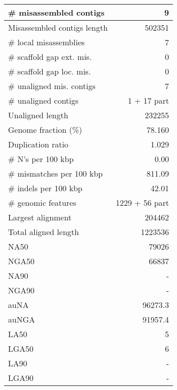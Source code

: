 \documentclass[12pt,a4paper]{article}
\begin{document}
\begin{table}[ht]
\begin{center}
\begin{tabular}{|l*{1}{|r}|}
\# misassembled contigs & 9 \\ \hline
Misassembled contigs length & 502351 \\ \hline
\# local misassemblies & 7 \\ \hline
\# scaffold gap ext. mis. & 0 \\ \hline
\# scaffold gap loc. mis. & 0 \\ \hline
\# unaligned mis. contigs & 7 \\ \hline
\# unaligned contigs & 1 + 17 part \\ \hline
Unaligned length & 232255 \\ \hline
Genome fraction (\%) & 78.160 \\ \hline
Duplication ratio & 1.029 \\ \hline
\# N's per 100 kbp & 0.00 \\ \hline
\# mismatches per 100 kbp & 811.09 \\ \hline
\# indels per 100 kbp & 42.01 \\ \hline
\# genomic features & 1229 + 56 part \\ \hline
Largest alignment & 204462 \\ \hline
Total aligned length & 1223536 \\ \hline
NA50 & 79026 \\ \hline
NGA50 & 66837 \\ \hline
NA90 & - \\ \hline
NGA90 & - \\ \hline
auNA & 96273.3 \\ \hline
auNGA & 91957.4 \\ \hline
LA50 & 5 \\ \hline
LGA50 & 6 \\ \hline
LA90 & - \\ \hline
LGA90 & - \\ \hline
\end{tabular}
\end{center}
\end{table}
\end{document}
